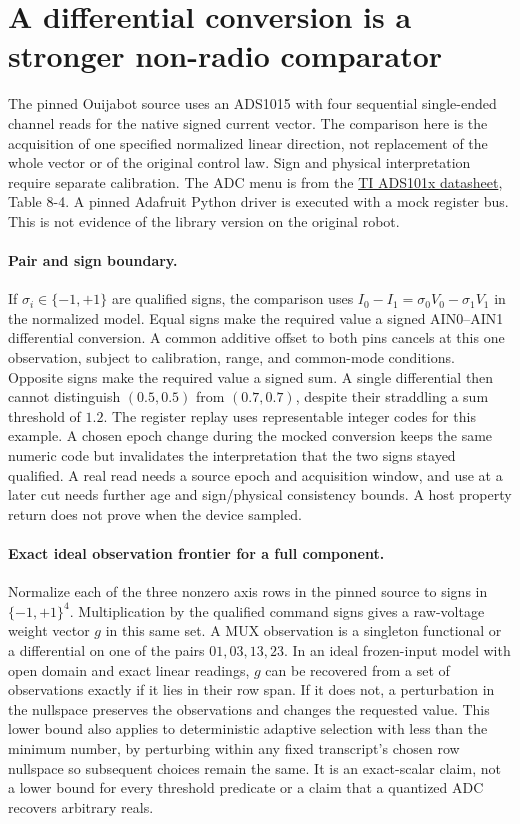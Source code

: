 \documentclass{article}
\begin{document}
\section*{A differential conversion is a stronger non-radio comparator}
The pinned Ouijabot source uses an ADS1015 with four sequential
single-ended channel reads for the native signed current vector.
The comparison here is the acquisition of one specified
normalized linear direction, not replacement of the whole vector or
of the original control law. Sign and physical interpretation require
separate calibration. The ADC menu is from the
\href{https://www.ti.com/lit/ds/symlink/ads1015.pdf}{TI ADS101x datasheet},
Table 8-4. A pinned Adafruit Python driver is executed with a mock
register bus. This is not evidence of the library version on the
original robot.

\paragraph{Pair and sign boundary.}
If $\sigma_i\in\{-1,+1\}$ are qualified signs, the comparison uses
$I_0-I_1=\sigma_0V_0-\sigma_1V_1$ in the normalized model.
Equal signs make the required value a signed AIN0--AIN1 differential
conversion. A common additive offset to both pins cancels at this
one observation, subject to calibration, range, and common-mode
conditions. Opposite signs make the required value a signed sum.
A single differential then cannot distinguish $(0.5,0.5)$ from
$(0.7,0.7)$, despite their straddling a sum threshold of $1.2$.
The register replay uses representable integer codes for this
example. A chosen epoch change during the mocked conversion keeps
the same numeric code but invalidates the interpretation that the
two signs stayed qualified. A real read needs a source epoch and
acquisition window, and use at a later cut needs further age and
sign/physical consistency bounds. A host property return does not
prove when the device sampled.

\paragraph{Exact ideal observation frontier for a full component.}
Normalize each of the three nonzero axis rows in the pinned source
to signs in $\{-1,+1\}^4$. Multiplication by the qualified command
signs gives a raw-voltage weight vector $g$ in this same set.
A MUX observation is a singleton functional or a differential on
one of the pairs $01,03,13,23$. In an ideal frozen-input model
with open domain and exact linear readings, $g$ can be recovered
from a set of observations exactly if it lies in their row span.
If it does not, a perturbation in the nullspace preserves the
observations and changes the requested value. This lower bound
also applies to deterministic adaptive selection with less than
the minimum number, by perturbing within any fixed transcript's
chosen row nullspace so subsequent choices remain the same.
It is an exact-scalar claim, not a lower bound for every threshold
predicate or a claim that a quantized ADC recovers arbitrary reals.
\end{document}
